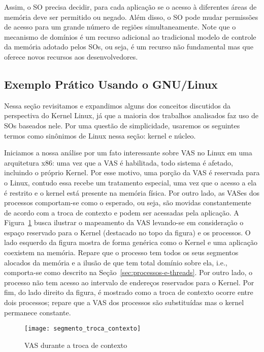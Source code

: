 Assim, o SO precisa decidir, para cada aplicação se o acesso à diferentes áreas
de memória deve ser permitido ou negado.  Além disso, o SO pode mudar
permissões de acesso para um grande número de regiões simultaneamente. Note que o
mecanismo de domínios é um recurso adicional ao tradicional modelo de controle
da memória adotado pelos SOs, ou seja, é um recurso não fundamental mas que
oferece novos recursos aos desenvolvedores.

\subsection{Exemplo Prático Usando o GNU/Linux}
\label{sec:visao_pratica_mem}

Nessa seção revisitamos e expandimos alguns dos conceitos discutidos da
perspectiva do Kernel Linux, já que a maioria dos trabalhos analisados faz uso
de SOs baseados nele.  Por uma questão de simplicidade, usaremos os seguintes
termos como sinônimos de Linux nessa seção: kernel e núcleo.

Iniciamos a nossa análise por um fato interessante sobre VAS no Linux em uma
arquitetura x86: uma vez que a VAS é habilitada, todo sistema é afetado,
incluindo o próprio Kernel. Por esse motivo, uma porção da VAS é reservada para
o Linux, contudo essa recebe um tratamento especial, uma vez que o acesso a ela é
restrito e o kernel está presente na memória física. Por outro lado, as VASes dos
processos comportam-se como o esperado, ou seja, são movidas constantemente de
acordo com a troca de contexto e podem ser acessadas pela aplicação. A
Figura~\ref{fig:vas_contexto} busca ilustrar o mapeamento da VAS levando-se em
consideração o espaço reservado para o Kernel (destacado no topo da figura) e os
processos. O lado esquerdo da figura mostra de forma genérica como o Kernel e
uma aplicação coexistem na memória. Repare que o processo tem todos os seus
segmentos alocados da memória e a ilusão de que tem total domínio sobre ela,
i.e., comporta-se como descrito na Seção~\ref{sec:processos-e-threads}. Por
outro lado, o processo não tem acesso ao intervalo de endereços reservados
para o Kernel. Por fim, do lado direito da figura, é mostrado como a troca de
contexto ocorre entre dois processos; repare que a VAS dos processos são
substituídas mas o kernel permanece constante.

\begin{figure}[!h]
  \centering
  \texttt{[image: segmento\_troca\_contexto]}
  \caption{VAS durante a troca de contexto~\citep{kernel_manage_mem}}
  \label{fig:vas_contexto}
\end{figure}

